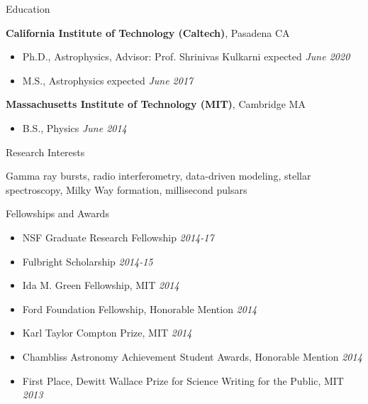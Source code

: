 \documentclass{resume} %
\begin{document}

\begin{rSection}{Education}

{\bf California Institute of Technology (Caltech)}, Pasadena CA
\begin{itemize}
\item Ph.D., Astrophysics, 
  Advisor: Prof. Shrinivas Kulkarni \hfill expected {\em June 2020} 
\end{itemize}

\begin{itemize}
  \item M.S., Astrophysics \hfill expected {\em June 2017}
\end{itemize}

{\bf Massachusetts Institute of Technology (MIT)}, Cambridge MA
\begin{itemize}
\item B.S., Physics \hfill {\em June 2014} 
\end{itemize}

\end{rSection}


\begin{rSection}{Research Interests}

Gamma ray bursts, radio interferometry,
data-driven modeling, stellar spectroscopy, Milky Way formation, 
millisecond pulsars

\end{rSection}


\begin{rSection}{Fellowships and Awards}

\begin{itemize}
\item
NSF Graduate Research Fellowship \hfill {\em 2014-17}
\item
Fulbright Scholarship \hfill {\em 2014-15}
\item
Ida M. Green Fellowship, MIT \hfill {\em 2014} 
\item
Ford Foundation Fellowship, Honorable Mention \hfill {\em 2014} 
\item
Karl Taylor Compton Prize, MIT \hfill {\em 2014} 
\item
Chambliss Astronomy Achievement Student Awards, Honorable Mention \hfill {\em 2014}
\item
First Place, Dewitt Wallace Prize for Science Writing for the Public, MIT \hfill {\em 2013} 
\end{itemize}

\end{rSection}
\end{document}
